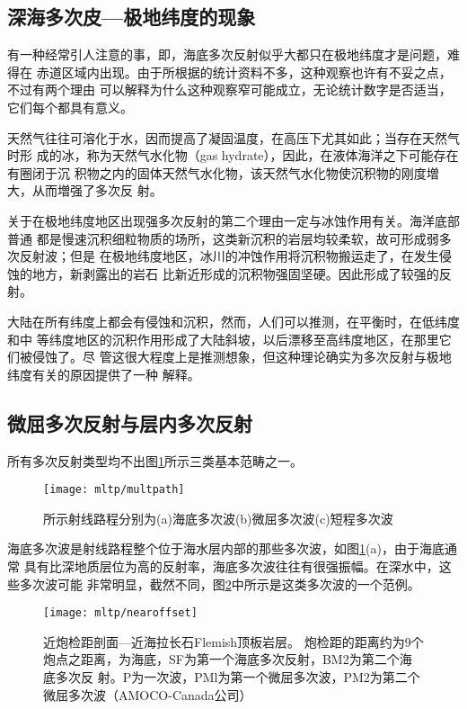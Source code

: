 \subsection{深海多次皮---极地纬度的现象}
\label{sec:5.5.4}

有一种经常引人注意的事，即，海底多次反射似乎大都只在极地纬度才是问题，难得在
赤道区域内出现。由于所根据的统计资料不多，这种观察也许有不妥之点，不过有两个理由
可以解释为什么这种观察窄可能成立，无论统计数字是否适当，它们每个都具有意义。

天然气往往可溶化于水，因而提高了凝固温度，在高压下尤其如此；当存在天然气时形
成的冰，称为天然气水化物（gas hydrate），因此，在液体海洋之下可能存在有圈闭于沉
积物之内的固体天然气水化物，该天然气水化物使沉积物的刚度増大，从而増强了多次反
射。

关于在极地纬度地区出现强多次反射的第二个理由一定与冰蚀作用有关。海洋底部普通
都是慢速沉积细粒物质的场所，这类新沉积的岩层均较柔软，故可形成弱多次反射波；但是
在极地纬度地区，冰川的冲蚀作用将沉积物搬运走了，在发生侵蚀的地方，新剥露出的岩石
比新近形成的沉积物强固坚硬。因此形成了较强的反射。

大陆在所有纬度上都会有侵蚀和沉积，然而，人们可以推测，在平衡时，在低纬度和中
等纬度地区的沉积作用形成了大陆斜坡，以后漂移至高纬度地区，在那里它们被侵蚀了。尽
管这很大程度上是推测想象，但这种理论确实为多次反射与极地纬度有关的原因提供了一种
解释。

\subsection{微屈多次反射与层内多次反射}
\label{sec:5.5.5}

所有多次反射类型均不出图\ref{fig:mltp/multpath}所示三类基本范畴之一。

\begin{figure}[H]
\centering
\texttt{[image: mltp/multpath]}
\caption[multpath]{
所示射线路程分别为(a)海底多次波(b)微屈多次波(c)短程多次波
}
\label{fig:mltp/multpath}
\end{figure}

海底多次波是射线路程整个位于海水层内部的那些多次波，如图\ref{fig:mltp/multpath}(a)，由于海底通常
具有比深地质层位为高的反射率，海底多次波往往有很强振幅。在深水中，这些多次波可能
非常明显，截然不同，图\ref{fig:mltp/nearoffset}中所示是这类多次波的一个范例。

\begin{figure}[H]
\centering
\texttt{[image: mltp/nearoffset]}
\caption[nearoffset]{
近炮检距剖面---近海拉长石Flemish顶板岩层。
炮检距的距离约为9个炮点之距离，为海底，SF为第一个海底多次反射，BM2为第二个海底多次反
射。P为一次波，PMl为第一个微屈多次波，PM2为第二个微屈多次波（AMOCO-Canada公司）
}
\label{fig:mltp/nearoffset}
\end{figure}


